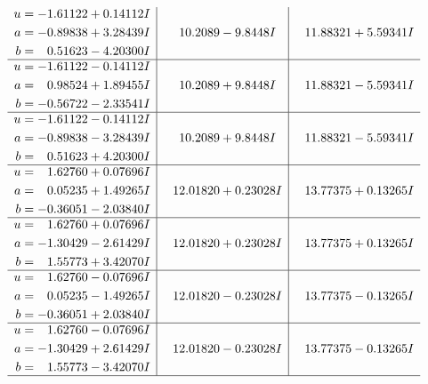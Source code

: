 \documentclass[1p]{elsarticle_modified}
\theoremstyle{definition}
\begin{document}
$$\begin{array}{c|c|c}
\begin{aligned}
u &= -1.61122 + 0.14112 I \\
a &= -0.89838 + 3.28439 I \\
b &= \phantom{-}0.51623 - 4.20300 I\end{aligned}
 & \phantom{-}10.2089 - 9.8448 I & \phantom{-}11.88321 + 5.59341 I \\ \hline\begin{aligned}
u &= -1.61122 - 0.14112 I \\
a &= \phantom{-}0.98524 + 1.89455 I \\
b &= -0.56722 - 2.33541 I\end{aligned}
 & \phantom{-}10.2089 + 9.8448 I & \phantom{-}11.88321 - 5.59341 I \\ \hline\begin{aligned}
u &= -1.61122 - 0.14112 I \\
a &= -0.89838 - 3.28439 I \\
b &= \phantom{-}0.51623 + 4.20300 I\end{aligned}
 & \phantom{-}10.2089 + 9.8448 I & \phantom{-}11.88321 - 5.59341 I \\ \hline\begin{aligned}
u &= \phantom{-}1.62760 + 0.07696 I \\
a &= \phantom{-}0.05235 + 1.49265 I \\
b &= -0.36051 - 2.03840 I\end{aligned}
 & \phantom{-}12.01820 + 0.23028 I & \phantom{-}13.77375 + 0.13265 I \\ \hline\begin{aligned}
u &= \phantom{-}1.62760 + 0.07696 I \\
a &= -1.30429 - 2.61429 I \\
b &= \phantom{-}1.55773 + 3.42070 I\end{aligned}
 & \phantom{-}12.01820 + 0.23028 I & \phantom{-}13.77375 + 0.13265 I \\ \hline\begin{aligned}
u &= \phantom{-}1.62760 - 0.07696 I \\
a &= \phantom{-}0.05235 - 1.49265 I \\
b &= -0.36051 + 2.03840 I\end{aligned}
 & \phantom{-}12.01820 - 0.23028 I & \phantom{-}13.77375 - 0.13265 I \\ \hline\begin{aligned}
u &= \phantom{-}1.62760 - 0.07696 I \\
a &= -1.30429 + 2.61429 I \\
b &= \phantom{-}1.55773 - 3.42070 I\end{aligned}
 & \phantom{-}12.01820 - 0.23028 I & \phantom{-}13.77375 - 0.13265 I\\
 \hline 
 \end{array}$$\newpage\newpage\renewcommand{\arraystretch}{1}
\end{document}
